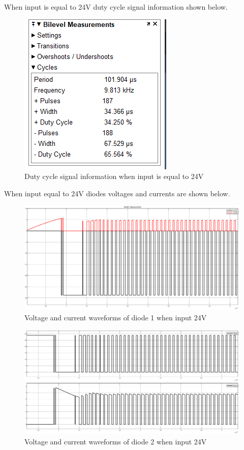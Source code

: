 \documentclass{article}
\newcommand\tab[1][1cm]{\hspace*{#1}}
\begin{document}
\tap When input is equal to 24V duty cycle signal information shown below.

\begin{figure}[H]
    \centering
    \includegraphics[scale=0.9]{duty24.PNG}
    \caption{Duty cycle signal information when input is equal to 24V}
    \label{fig:my_label}
\end{figure}
\tab When input equal to 24V diodes voltages and currents are shown below. 
\begin{figure}[H]
    \centering
    \includegraphics[scale=0.3]{24diode1.png}
    \caption{Voltage and current waveforms of diode 1 when input 24V}
    \label{fig:my_label}
\end{figure}

\begin{figure}[H]
    \centering
    \includegraphics[scale=0.3]{24diode2.png}
    \caption{Voltage and current waveforms of diode 2 when input 24V}
    \label{fig:my_label}
\end{figure}
\end{document}
